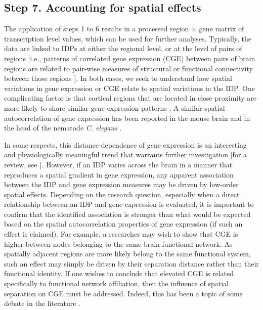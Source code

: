 \subsection{Step 7. Accounting for spatial effects}

The application of steps 1 to 6 results in a processed region $\times$ gene matrix of transcription level values, which can be used for further analyses. Typically, the data are linked to IDPs at either the regional level, or at the level of pairs of regions [i.e., patterns of correlated gene expression (CGE) between pairs of brain regions are related to pair-wise measures of structural or functional connectivity between those regions \citep{Fornito2019}]. In both cases, we seek to understand how spatial variations in gene expression or CGE relate to spatial variations in the IDP. One complicating factor is that cortical regions that are located in close proximity are more likely to share similar gene expression patterns \citep{Richiardi2015,Krienen2016,Vertes2016b,Pantazatos2017,Richiardi2017}. A similar spatial autocorrelation of gene expression has been reported in the mouse brain \citep{Fulcher2016} and in the head of the nematode \textit{C. elegans} \citep{Arnatkeviciute2018}.

In some respects, this distance-dependence of gene expression is an interesting and physiologically meaningful trend that warrants further investigation [for a review, see \citep{Fornito2019}]. However, if an IDP varies across the brain in a manner that reproduces a spatial gradient in gene expression, any apparent association between the IDP and gene expression measures may be driven by low-order spatial effects. Depending on the research question, especially when a direct relationship between an IDP and gene expression is evaluated, it is important to confirm that the identified association is stronger than what would be expected based on the spatial autocorrelation properties of gene expression (if such an effect is claimed). For example, a researcher may wish to show that CGE is higher between nodes belonging to the same brain functional network. As spatially adjacent regions are more likely belong to the same functional system, such an effect may simply be driven by their separation distance rather than their functional identity. If one wishes to conclude that elevated CGE is related specifically to functional network affiliation, then the influence of spatial separation on CGE must be addressed. Indeed, this has been a topic of some debate in the literature \citep{Richiardi2015,Pantazatos2017,Richiardi2017}.

